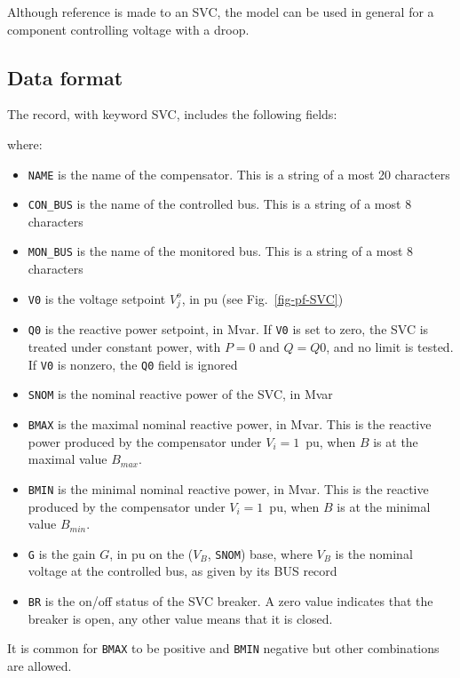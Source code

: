 Although reference is made to an SVC, the model can be used in general for a component controlling voltage with a droop.

\subsection{Data format}

The record, with keyword SVC, includes the following fields:

\hspace*{5ex}{\tt SVC NAME CON\_BUS MON\_BUS V0 Q0 SNOM BMAX BMIN G BR ;}

where:
\begin{itemize}
\item {\tt NAME} is the name of the compensator. This is a string of a most 20 characters
\item {\tt CON\_BUS} is the name of the controlled bus. This is a string of a most 8 characters
\item {\tt MON\_BUS} is the name of the monitored bus. This is a string of a most 8 characters
\item {\tt V0} is the voltage setpoint $V_j^o$, in pu (see Fig.~\ref{fig-pf-SVC}) 
\item {\tt Q0} is the reactive power setpoint, in Mvar. If {\tt V0} is set to zero, the SVC is treated under constant power, with $P = 0$ and $Q = Q0$, and no limit is
tested. If {\tt V0} is nonzero, the {\tt Q0} field is ignored
\item {\tt SNOM} is the nominal reactive power of the SVC, in Mvar
\item {\tt BMAX} is the maximal nominal reactive power, in Mvar. This is the reactive 
power produced by the compensator under $V_i = 1$~pu, when $B$ is at
the maximal value $B_{max}$.
\item {\tt BMIN} is the minimal nominal reactive power, in Mvar. This is the reactive
produced by the compensator under $V_i = 1$~pu, when $B$ is at
the minimal value $B_{min}$.
\item {\tt G} is the gain $G$, in pu on the ($V_B$, {\tt SNOM}) base, where $V_B$ is the nominal voltage at the controlled bus, as given by its BUS record
\item {\tt BR} is the on/off status of the SVC breaker. A zero value indicates that
the breaker is open, any other value means that it is closed.
\end{itemize}

It is common for {\tt BMAX} to be positive and {\tt BMIN} negative but other combinations are allowed.

